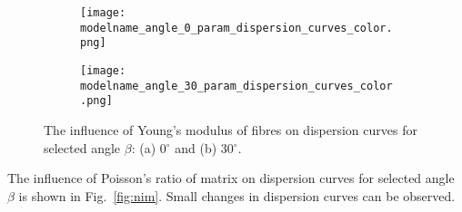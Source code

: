 \documentclass[preprint,12pt]{elsarticle}
\begin{document}
\begin{figure} [h!]
	\centering
	\newcommand{\modelname}{SASE5_plain_weave}
	\begin{subfigure}[b]{0.49\textwidth}
		\centering
		\texttt{[image: \\modelname\_angle\_0\_param\_dispersion\_curves\_color.png]}
		\caption{}
		\label{fig:ef0}
	\end{subfigure}
	\hfill
	\begin{subfigure}[b]{0.49\textwidth}
		\centering
		\texttt{[image: \\modelname\_angle\_30\_param\_dispersion\_curves\_color.png]}
		\caption{}
		\label{fig:ef30}
	\end{subfigure}
		\caption{The influence of Young's modulus of fibres on dispersion curves for selected angle $\beta$: (a) 0$^{\circ}$ and (b) 30$^{\circ}$.} 
	\label{fig:ef}
\end{figure}

The influence of  Poisson's ratio of matrix on dispersion curves for selected angle $\beta$ is shown in Fig.~\ref{fig:nim}. Small changes in dispersion curves can be observed.
\end{document}
